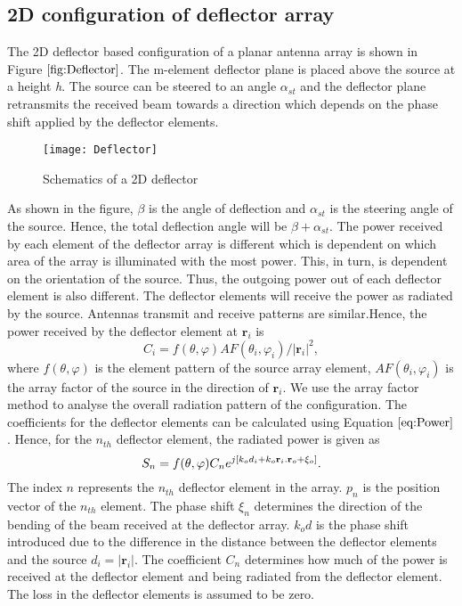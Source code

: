 \documentclass[titlepage]{article}
\begin{document}
\subsection{2D configuration of deflector array}
 The 2D deflector based configuration of a planar antenna array is shown in Figure $\ref{fig:Deflector}$. The m-element deflector plane is placed above the source at a height \emph{h}. The source can be steered to an angle $\alpha_{st}$ and the deflector plane retransmits the received beam towards a direction which depends on the phase shift applied by the deflector elements.
\begin{figure}[!hbp]
\centering
\texttt{[image: Deflector]}
\caption{Schematics of a 2D deflector}
\label{fig:Deflector}
\end{figure}
As shown in the figure, $\beta$ is the angle of deflection and $\alpha_{st}$ is the steering angle of the source. Hence, the total deflection angle will be $\beta + \alpha_{st}$.
\newline
The power received by each element of the deflector array is different which is dependent on which area of the array is illuminated with the most power. This, in turn, is dependent on the orientation of the source. Thus, the outgoing power out of each deflector element is also different. The deflector elements will receive the power as radiated by the source. Antennas transmit and receive patterns are similar.Hence, the power received by the deflector element at $\textbf{r}_i$ is
\begin{equation}
C_i =  f(\theta,\varphi)AF(\theta_i,\varphi_i) / |\textbf{r}_i|^2 ,
\label{eq:Power}
\end{equation}
where $f(\theta,\varphi)$ is the element pattern of the source array element, $AF(\theta_i,\varphi_i)$ is the array factor of the source in the direction of $\textbf{r}_i$.
\newline
We use the array factor method to analyse the overall radiation pattern of the configuration.  The coefficients for the deflector elements can be calculated using Equation $\ref{eq:Power}$. Hence, for the $n_{th}$ deflector element, the radiated power is given as
\begin{equation}
\centering
S_n=f(\theta,\varphi)C_ne^{j[k_od_i + k_o\textbf{r}_i.\textbf{r}_o + \xi_o]}.
\label{eq:Pat}
\end{equation}
The index $n$ represents the $n_{th}$ deflector element in the array. $p_n$ is the position vector of the $n_{th}$ element. The phase shift $\xi_n$ determines the direction of the bending of the beam received at the deflector array. $k_od$ is the phase shift introduced due to the difference in the distance between the deflector elements and the source $d_i=|\textbf{r}_i|$. The coefficient $C_n$ determines how much of the power is received at the deflector element and being radiated from the deflector element. The loss in the deflector elements is assumed to be zero.
\end{document}
